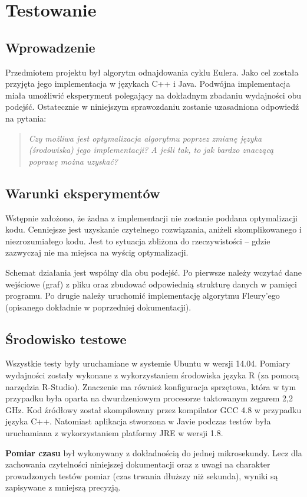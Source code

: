 \section{Testowanie}

\subsection{Wprowadzenie}

Przedmiotem projektu był algorytm odnajdowania cyklu Eulera. 
Jako cel została przyjęta jego implementacja w językach C++ i Java.
Podwójna implementacja miała umożliwić eksperyment polegający na dokładnym zbadaniu wydajności obu podejść.
Ostatecznie w niniejszym sprawozdaniu zostanie uzasadniona odpowiedź na pytania:
\begin{quote}
\textit{
Czy możliwa jest optymalizacja algorytmu poprzez zmianę języka (środowiska) jego implementacji?
A jeśli tak, to jak bardzo znaczącą poprawę można uzyskać?
}
\end{quote}

\subsection{Warunki eksperymentów}

Wstępnie założono, że żadna z implementacji nie zostanie poddana optymalizacji kodu.
Cenniejsze jest uzyskanie czytelnego rozwiązania, aniżeli skomplikowanego i niezrozumiałego kodu.
Jest to sytuacja zbliżona do rzeczywistości -- gdzie zazwyczaj nie ma miejsca na wyścig optymalizacji.

Schemat działania jest wspólny dla obu podejść.
Po pierwsze należy wczytać dane wejściowe (graf) z pliku oraz zbudować odpowiednią strukturę danych w pamięci programu.
Po drugie należy uruchomić implementację algorytmu Fleury'ego (opisanego dokładnie w poprzedniej dokumentacji).


\subsection{Środowisko testowe}

Wszystkie testy były uruchamiane w systemie Ubuntu w wersji 14.04.
Pomiary wydajności zostały wykonane z wykorzystaniem środowiska języka R (za pomocą narzędzia R-Studio).
Znaczenie ma również konfiguracja sprzętowa, która w tym przypadku była oparta na dwurdzeniowym procesorze taktowanym zegarem 2,2 GHz.
Kod źródłowy został skompilowany przez kompilator GCC 4.8 w przypadku języka C++.
Natomiast aplikacja stworzona w Javie podczas testów była uruchamiana z wykorzystaniem platformy JRE w wersji  1.8.

\textbf{Pomiar czasu} był wykonywany z dokładnością do jednej mikrosekundy.
Lecz dla zachowania czytelności niniejszej dokumentacji oraz z uwagi na charakter prowadzonych testów pomiar (czas trwania dłuższy niż sekunda), wyniki są zapisywane z mniejszą precyzją.


